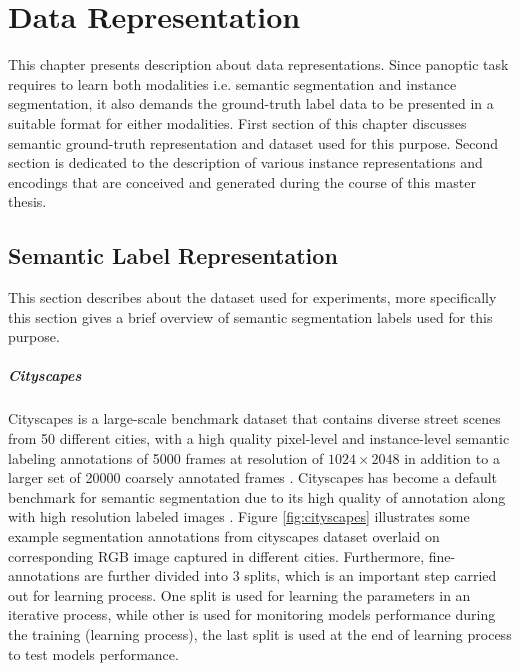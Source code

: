 
\chapter{Data Representation}
\label{sec:data_representation}

This chapter presents description about data representations. Since panoptic task requires to learn both modalities i.e. semantic segmentation and instance segmentation, it also demands the ground-truth label data to be presented in a suitable format for either modalities. First section of this chapter discusses semantic ground-truth representation and dataset used for this purpose. Second section is dedicated to the description of various instance representations and encodings that are conceived and generated during the course of this master thesis.  




\section{Semantic Label Representation}

This section describes about the dataset used for experiments, more specifically this section gives a brief overview of semantic segmentation labels used for this purpose. 

\paragraph{Cityscapes}

Cityscapes is a large-scale benchmark dataset that contains diverse street scenes from 50 different cities, with a high quality pixel-level and instance-level semantic labeling annotations of 5000 frames at resolution of $1024 \times 2048$ in addition to a larger set of 20000 coarsely annotated frames \cite{Cordts2015}. Cityscapes has become a default benchmark for semantic segmentation due to its high quality of annotation along with high resolution labeled images \cite{DBLPbenchmark:journals/corr/abs-1709-07322}. Figure \ref{fig:cityscapes} illustrates
some example segmentation annotations from cityscapes dataset overlaid on corresponding RGB image captured in different cities. Furthermore, fine-annotations are further divided into 3 splits, which is an important step carried out for learning process. One split is used for learning the parameters in an iterative process, while other is used for monitoring models performance during  the training (learning process), the last split is used at the end of learning process to test models performance.

